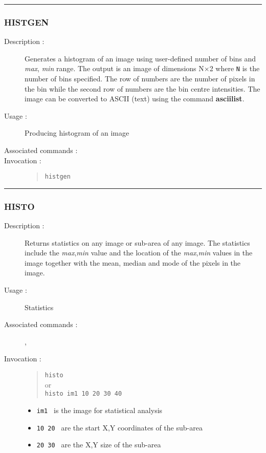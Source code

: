 \hrule
\subsubsection*{\label{HISTGEN}HISTGEN}

\begin{description}

\item[Description :] Generates a histogram of an image using
user-defined number of bins and {\it max}, {\it min} range.  The output
is an image of dimensions N$\times$2 where {\tt N} is the number of bins
specified.  The row of numbers are the number of pixels in the bin
while the second row of numbers are the bin centre intensities.  The
image can be converted to ASCII (text) using the command {\bf asciilist}.

\item[Usage :] Producing histogram of an image
\item[Associated commands :] {\tt {}}
\item[Invocation :]

\begin{quote}{\tt  histgen }\end{quote}

\end{description}

\hrule
\subsubsection*{\label{HISTO}HISTO}

\begin{description}

\item[Description :] Returns statistics on any image or sub-area of any
image.  The statistics include the {\it max},{\it min} value and the
location of the {\it max},{\it min} values in the image together with
the mean, median and mode of the pixels in the image.

\item[Usage :] Statistics

\item[Associated commands :] {\tt {}},
{\tt {}}

\item[Invocation :]

\begin{quote}{\tt  histo }\\
or \\
{\tt histo im1 10 20 30 40 }
\end{quote}

\begin{itemize}

\item {\tt im1 } is the image for statistical analysis
\item {\tt 10 20 } are the start X,Y coordinates of the sub-area
\item {\tt 20 30 } are the X,Y size of the sub-area
\end{itemize}\end{description}


